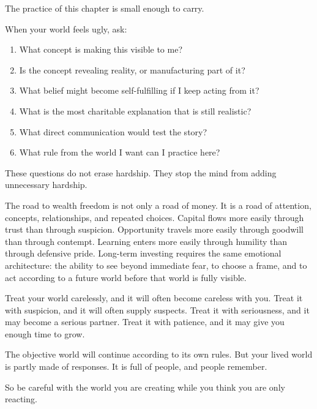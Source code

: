 The practice of this chapter is small enough to carry.

When your world feels ugly, ask:

\begin{enumerate}
\item What concept is making this visible to me?
\item Is the concept revealing reality, or manufacturing part of it?
\item What belief might become self-fulfilling if I keep acting from it?
\item What is the most charitable explanation that is still realistic?
\item What direct communication would test the story?
\item What rule from the world I want can I practice here?
\end{enumerate}

These questions do not erase hardship. They stop the mind from adding unnecessary hardship.

The road to wealth freedom is not only a road of money. It is a road of attention, concepts, relationships, and repeated choices. Capital flows more easily through trust than through suspicion. Opportunity travels more easily through goodwill than through contempt. Learning enters more easily through humility than through defensive pride. Long-term investing requires the same emotional architecture: the ability to see beyond immediate fear, to choose a frame, and to act according to a future world before that world is fully visible.

Treat your world carelessly, and it will often become careless with you. Treat it with suspicion, and it will often supply suspects. Treat it with seriousness, and it may become a serious partner. Treat it with patience, and it may give you enough time to grow.

The objective world will continue according to its own rules. But your lived world is partly made of responses. It is full of people, and people remember.

So be careful with the world you are creating while you think you are only reacting.
